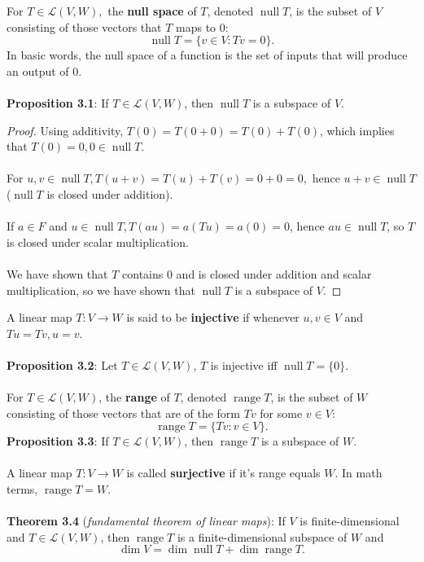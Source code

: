 \documentclass{article}
\DeclareMathOperator{\Null}{null}
\DeclareMathOperator{\Range}{range}
\DeclareMathOperator{\Dim}{dim}
\theoremstyle{definition}
\begin{document}
For $T \in \mathcal{L}(V, W),$ the \textbf{null space} of $T$, denoted $\Null{T}$, is the subset of $V$ consisting of those vectors that $T$ maps to $0$: $$\Null{T} = \{v \in V: Tv = 0\}.$$ In basic words, the null space of a function is the set of inputs that will produce an output of 0. \\ \\
\textbf{Proposition 3.1}: If $T \in \mathcal{L}(V, W)$, then $\Null T$ is a subspace of $V$.
\begin{proof} Using additivity, $T(0) = T(0 + 0) = T(0) + T(0)$, which implies that $T(0) = 0, 0 \in \Null{T}$. \\ \\
For $u, v \in \Null{T}, T(u + v) = T(u) + T(v) = 0 + 0 = 0,$ hence $u + v \in \Null{T}$ ($\Null{T}$ is closed under addition). \\ \\
If $a \in F$ and $u \in \Null{T}, T(au) = a(Tu) = a(0) = 0$, hence $au \in \Null{T}$, so $T$ is closed under scalar multiplication. \\ \\
We have shown that $T$ contains 0 and is closed under addition and scalar multiplication, so we have shown that $\Null{T}$ is a subspace of $V$.
\end{proof} $ $ \\
A linear map $T: V \rightarrow W$ is said to be \textbf{injective} if whenever $u, v \in V$ and $Tu = Tv, u = v$. \\ \\
\textbf{Proposition 3.2}: Let $T \in \mathcal{L}(V, W)$, $T$ is injective iff $\Null{T} = \{0\}$. \\ \\
For $T \in \mathcal{L}(V, W)$, the \textbf{range} of $T$, denoted $\Range{T}$, is the subset of $W$ consisting of those vectors that are of the form $Tv$ for some $v \in V$: $$\Range{T} = \{Tv: v \in V\}.$$ $ $ \\
\textbf{Proposition 3.3}: If $T \in \mathcal{L}(V, W)$, then $\Range{T}$ is a subspace of $W$. \\ \\
A linear map $T: V \rightarrow W$ is called \textbf{surjective} if it's range equals $W$. In math terms, $\Range{T} = W$. \\ \\
\textbf{Theorem 3.4} (\textit{fundamental theorem of linear maps}): If $V$ is finite-dimensional and $T \in \mathcal{L}(V, W)$, then $\Range{T}$ is a finite-dimensional subspace of $W$ and $$\Dim{V} = \Dim{\Null{T}} + \Dim{\Range{T}}.$$ $ $ \\
\end{document}
